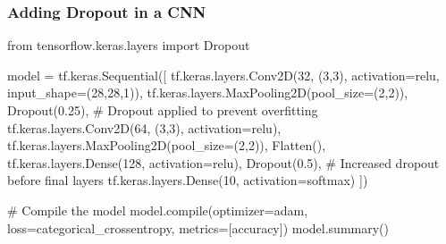 \documentclass[
  letterpaper,
  DIV=11,
  numbers=noendperiod]{scrreprt}
\newenvironment{Shaded}{\begin{snugshade}}{\end{snugshade}}
\newcommand{\BuiltInTok}[1]{\textcolor[rgb]{0.00,0.23,0.31}{#1}}
\newcommand{\CommentTok}[1]{\textcolor[rgb]{0.37,0.37,0.37}{#1}}
\newcommand{\DecValTok}[1]{\textcolor[rgb]{0.68,0.00,0.00}{#1}}
\newcommand{\FloatTok}[1]{\textcolor[rgb]{0.68,0.00,0.00}{#1}}
\newcommand{\ImportTok}[1]{\textcolor[rgb]{0.00,0.46,0.62}{#1}}
\newcommand{\NormalTok}[1]{\textcolor[rgb]{0.00,0.23,0.31}{#1}}
\newcommand{\OperatorTok}[1]{\textcolor[rgb]{0.37,0.37,0.37}{#1}}
\newcommand{\StringTok}[1]{\textcolor[rgb]{0.13,0.47,0.30}{#1}}
\begin{document}
\subsubsection{Adding Dropout in a CNN}\label{adding-dropout-in-a-cnn}

\begin{Shaded}
\begin{Highlighting}[]
\ImportTok{from}\NormalTok{ tensorflow.keras.layers }\ImportTok{import}\NormalTok{ Dropout}

\NormalTok{model }\OperatorTok{=}\NormalTok{ tf.keras.Sequential([}
\NormalTok{    tf.keras.layers.Conv2D(}\DecValTok{32}\NormalTok{, (}\DecValTok{3}\NormalTok{,}\DecValTok{3}\NormalTok{), activation}\OperatorTok{=}\StringTok{\textquotesingle{}relu\textquotesingle{}}\NormalTok{, input\_shape}\OperatorTok{=}\NormalTok{(}\DecValTok{28}\NormalTok{,}\DecValTok{28}\NormalTok{,}\DecValTok{1}\NormalTok{)),}
\NormalTok{    tf.keras.layers.MaxPooling2D(pool\_size}\OperatorTok{=}\NormalTok{(}\DecValTok{2}\NormalTok{,}\DecValTok{2}\NormalTok{)),}
\NormalTok{    Dropout(}\FloatTok{0.25}\NormalTok{),  }\CommentTok{\# Dropout applied to prevent overfitting}
\NormalTok{    tf.keras.layers.Conv2D(}\DecValTok{64}\NormalTok{, (}\DecValTok{3}\NormalTok{,}\DecValTok{3}\NormalTok{), activation}\OperatorTok{=}\StringTok{\textquotesingle{}relu\textquotesingle{}}\NormalTok{),}
\NormalTok{    tf.keras.layers.MaxPooling2D(pool\_size}\OperatorTok{=}\NormalTok{(}\DecValTok{2}\NormalTok{,}\DecValTok{2}\NormalTok{)),}
\NormalTok{    Flatten(),}
\NormalTok{    tf.keras.layers.Dense(}\DecValTok{128}\NormalTok{, activation}\OperatorTok{=}\StringTok{\textquotesingle{}relu\textquotesingle{}}\NormalTok{),}
\NormalTok{    Dropout(}\FloatTok{0.5}\NormalTok{),  }\CommentTok{\# Increased dropout before final layers}
\NormalTok{    tf.keras.layers.Dense(}\DecValTok{10}\NormalTok{, activation}\OperatorTok{=}\StringTok{\textquotesingle{}softmax\textquotesingle{}}\NormalTok{)}
\NormalTok{])}

\CommentTok{\# Compile the model}
\NormalTok{model.}\BuiltInTok{compile}\NormalTok{(optimizer}\OperatorTok{=}\StringTok{\textquotesingle{}adam\textquotesingle{}}\NormalTok{, loss}\OperatorTok{=}\StringTok{\textquotesingle{}categorical\_crossentropy\textquotesingle{}}\NormalTok{, metrics}\OperatorTok{=}\NormalTok{[}\StringTok{\textquotesingle{}accuracy\textquotesingle{}}\NormalTok{])}
\NormalTok{model.summary()}
\end{Highlighting}
\end{Shaded}
\end{document}
